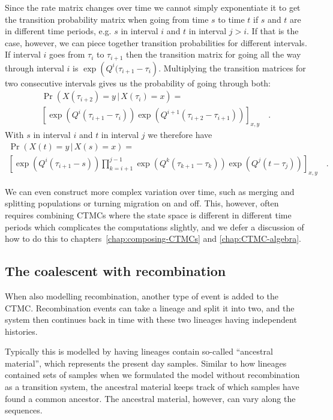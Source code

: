 Since the rate matrix changes over time we cannot simply exponentiate it to get the transition probability matrix when going from time $s$ to time $t$ if $s$ and $t$ are in different time periods, e.g. $s$ in interval $i$ and $t$ in interval $j>i$. If that is the case, however, we can piece together transition probabilities for different intervals. If interval $i$ goes from $\tau_i$ to $\tau_{i+1}$ then the transition matrix for going all the way through interval $i$ is $\exp\left(Q^i(\tau_{i+1}-\tau_i\right)$. Multiplying the transition matrices for two consecutive intervals gives us the probability of going through both:
\begin{multline*}
  \Pr\left(X(\tau_{i+2})=y\,|\,X(\tau_i)=x\right) = \\
   \left[\exp\left(Q^i\left(\tau_{i+1}-\tau_i\right)\right)
         \exp\left(Q^{i+1}\left(\tau_{i+2}-\tau_{i+1}\right)\right)
   \right]_{x,y}
   \quad .
\end{multline*}
With $s$ in interval $i$ and $t$ in interval $j$ we therefore have\begin{multline*}
  \Pr\left(X(t)=y\,|\,X(s)=x\right) = \\
  \left[
      \exp\left(Q^i\left(\tau_{i+1}-s\right)\right)
      \prod_{k=i+1}^{j-1} \exp\left(Q^k\left(\tau_{k+1}-\tau_k\right)\right)
      \exp\left(Q^j\left(t-\tau_j\right)\right)
  \right]_{x,y}
  \quad .
\end{multline*}

We can even construct more complex variation over time, such as merging and splitting populations or turning migration on and off. This, however, often requires combining CTMCs where the state space is different in different time periods which complicates the computations slightly, and we defer a discussion of how to do this to chapters~\ref{chap:composing-CTMCs} and \ref{chap:CTMC-algebra}.


\subsection{The coalescent with recombination}

When also modelling recombination, another type of event is added to the CTMC. Recombination events can take a lineage and split it into two, and the system then continues back in time with these two lineages having independent histories.

Typically this is modelled by having lineages contain so-called ``ancestral material'', which represents the present day samples. Similar to how lineages contained sets of samples when we formulated the model without recombination as a transition system, the ancestral material keeps track of which samples have found a common ancestor. The ancestral material, however, can vary along the sequences.

